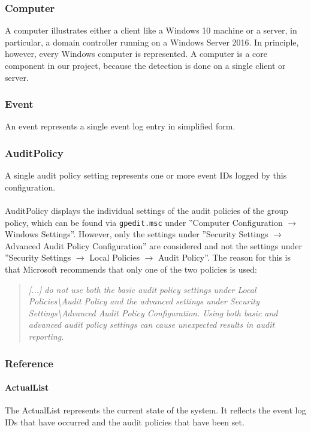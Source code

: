 \subsubsection{Computer}
A computer illustrates either a client like a Windows 10 machine or a server, in particular, a domain controller running on a Windows Server 2016. In principle, however, every Windows computer is represented. A computer is a core component in our project, because the detection is done on a single client or server. 

\subsubsection{Event}
An event represents a single event log entry in simplified form.

\subsubsection{AuditPolicy}\label{DomainModelAuditPolicy}
A single audit policy setting represents one or more event IDs logged by this configuration.
\\\\
AuditPolicy displays the individual settings of the audit policies of the group policy, which can be found via \lstinline|gpedit.msc| under ''Computer Configuration $\rightarrow$ Windows Settings''. However, only the settings under ''Security Settings $\rightarrow$ Advanced Audit Policy Configuration'' are considered and not the settings under ''Security Settings $\rightarrow$ Local Policies $\rightarrow$ Audit Policy''. The reason for this is that Microsoft recommends that only one of the two policies is used:
\begin{quotation}
    \textit{[...] do not use both the basic audit policy settings under Local Policies\textbackslash Audit Policy and the advanced settings under Security Settings\textbackslash Advanced Audit Policy Configuration. Using both basic and advanced audit policy settings can cause unexpected results in audit reporting.} \cite{AdvancedSecurityAuditing}
\end{quotation}

\subsubsection{Reference}
\paragraph{ActualList}
The ActualList represents the current state of the system. It reflects the event log IDs that have occurred and the audit policies that have been set.

